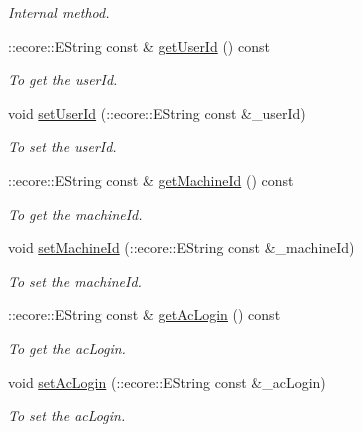 \begin{DoxyCompactItemize}
\begin{DoxyCompactList}\small\item\em Internal method. \item\end{DoxyCompactList}\item 
::ecore::EString const \& \hyperlink{classUMS__Data_1_1LocalAccount_ac48d0e7252dee2cc540bdf60484a8f47}{getUserId} () const 
\begin{DoxyCompactList}\small\item\em To get the userId. \item\end{DoxyCompactList}\item 
void \hyperlink{classUMS__Data_1_1LocalAccount_ad09813b432580611ca3fa5da5fcd1b9c}{setUserId} (::ecore::EString const \&\_\-userId)
\begin{DoxyCompactList}\small\item\em To set the userId. \item\end{DoxyCompactList}\item 
::ecore::EString const \& \hyperlink{classUMS__Data_1_1LocalAccount_a6a1fa3089ee2f729bd7c31f69032029d}{getMachineId} () const 
\begin{DoxyCompactList}\small\item\em To get the machineId. \item\end{DoxyCompactList}\item 
void \hyperlink{classUMS__Data_1_1LocalAccount_a967be451f382d6fbd9462db93630be09}{setMachineId} (::ecore::EString const \&\_\-machineId)
\begin{DoxyCompactList}\small\item\em To set the machineId. \item\end{DoxyCompactList}\item 
::ecore::EString const \& \hyperlink{classUMS__Data_1_1LocalAccount_a0b9641070e019a0b17df06347a993924}{getAcLogin} () const 
\begin{DoxyCompactList}\small\item\em To get the acLogin. \item\end{DoxyCompactList}\item 
void \hyperlink{classUMS__Data_1_1LocalAccount_a542947af3a01d6e3f0e7f37a1ec9fcfe}{setAcLogin} (::ecore::EString const \&\_\-acLogin)
\begin{DoxyCompactList}\small\item\em To set the acLogin. \item\end{DoxyCompactList}\item 

\end{DoxyCompactItemize}
